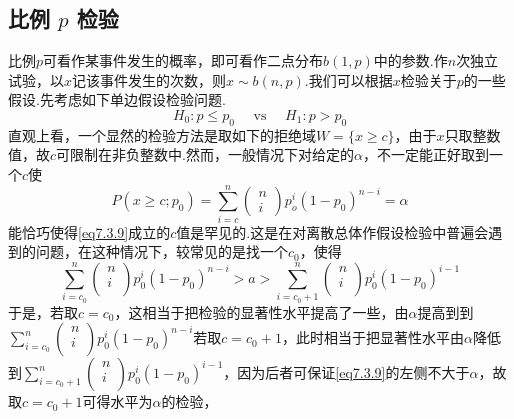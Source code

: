 \subsection{比例 $p$ 检验}\label{sec:7.3.2}
比例$p$可看作某事件发生的概率，即可看作二点分布$b(1,p)$中的参数.作$n$次独立试验，以$x$记该事件发生的次数，则$x\sim b(n,p)$.我们可以根据$x$检验关于$p$的一些假设.先考虑如下单边假设检验问题.
\begin{equation}\label{eq7.3.8}
H _ { 0 } : p \leq p _ { 0 } \quad \text { vs } \quad H _ { 1 } : p > p _ { 0 }
\end{equation}
直观上看，一个显然的检验方法是取如下的拒绝域$W=\{x\geq c\}$，由于$x$只取整数值，故$c$可限制在非负整数中.然而，一般情况下对给定的$\alpha$，不一定能正好取到一个$c$使
	\begin{equation}\label{eq7.3.9}
	P \left( x \geq c ; p _ { 0 } \right) = \sum _ { i = c } ^ { n } \left( \begin{array} { l } { n } \\ { i } \end{array} \right) p _ { o } ^ { i } \left( 1 - p _ { 0 } \right) ^ { n - i } = \alpha
	\end{equation}
能恰巧使得\ref{eq7.3.9}成立的$c$值是罕见的.这是在对离散总体作假设检验中普遍会遇到的问题，在这种情况下，较常见的是找一个$c_{0}$，使得
\[\sum_{i=c_0}^n{\left(\begin{array}{l}
	n\\
	i\\
	\end{array}\right)}p_{0}^{i}\left(1-p_0\right)^{n-i}>a>\sum_{i=c_0+1}^n{\left(\begin{array}{c}
	n\\
	i\\
	\end{array}\right)}p_{0}^{i}\left(1-p_0\right)^{i-1}\]
于是，若取$c=c_{0}$，这相当于把检验的显著性水平提高了一些，由$\alpha$提高到到$\sum_{i=c_0}^n{\left(\begin{array}{l}
	n\\
	i\\
	\end{array}\right)}p_{0}^{i}\left(1-p_0\right)^{n-i}$若取$c=c_{0}+1$，此时相当于把显著性水平由$\alpha$降低到$\sum_{i=c_0+1}^n{\left(\begin{array}{c}
	n\\
	i\\
	\end{array}\right)}p_{0}^{i}\left(1-p_0\right)^{i-1}$，因为后者可保证\ref{eq7.3.9}的左侧不大于$\alpha$，故取$c=c_{0}+1$可得水平为$\alpha$的检验，

